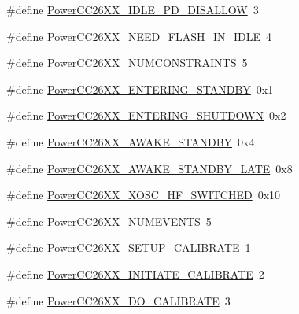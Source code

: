 \begin{DoxyCompactItemize}
\#define \hyperlink{_power_c_c26_x_x_8h_a1cdfc7000203fc9fb74ad3872c1136cc}{Power\+C\+C26\+X\+X\+\_\+\+I\+D\+L\+E\+\_\+\+P\+D\+\_\+\+D\+I\+S\+A\+L\+L\+O\+W}~3
\item 
\#define \hyperlink{_power_c_c26_x_x_8h_a1f1dee2876bca97a20c152ca9b6c2fb5}{Power\+C\+C26\+X\+X\+\_\+\+N\+E\+E\+D\+\_\+\+F\+L\+A\+S\+H\+\_\+\+I\+N\+\_\+\+I\+D\+L\+E}~4
\item 
\#define \hyperlink{_power_c_c26_x_x_8h_a08e787d2a1ff1b373b209e68fc797e31}{Power\+C\+C26\+X\+X\+\_\+\+N\+U\+M\+C\+O\+N\+S\+T\+R\+A\+I\+N\+T\+S}~5
\item 
\#define \hyperlink{_power_c_c26_x_x_8h_a88d658da388e2fc58328283b3349003e}{Power\+C\+C26\+X\+X\+\_\+\+E\+N\+T\+E\+R\+I\+N\+G\+\_\+\+S\+T\+A\+N\+D\+B\+Y}~0x1
\item 
\#define \hyperlink{_power_c_c26_x_x_8h_a09692bd5d3fb7c16fcf320b0490f29fa}{Power\+C\+C26\+X\+X\+\_\+\+E\+N\+T\+E\+R\+I\+N\+G\+\_\+\+S\+H\+U\+T\+D\+O\+W\+N}~0x2
\item 
\#define \hyperlink{_power_c_c26_x_x_8h_a7f9f2c7a5f0c307aeab0b9854d2384b9}{Power\+C\+C26\+X\+X\+\_\+\+A\+W\+A\+K\+E\+\_\+\+S\+T\+A\+N\+D\+B\+Y}~0x4
\item 
\#define \hyperlink{_power_c_c26_x_x_8h_ae9a4db5e58593a5bc2f6cbba3c8ed283}{Power\+C\+C26\+X\+X\+\_\+\+A\+W\+A\+K\+E\+\_\+\+S\+T\+A\+N\+D\+B\+Y\+\_\+\+L\+A\+T\+E}~0x8
\item 
\#define \hyperlink{_power_c_c26_x_x_8h_a592028a2a5ba6e323205a6400ef11b07}{Power\+C\+C26\+X\+X\+\_\+\+X\+O\+S\+C\+\_\+\+H\+F\+\_\+\+S\+W\+I\+T\+C\+H\+E\+D}~0x10
\item 
\#define \hyperlink{_power_c_c26_x_x_8h_ac622d8239ba9b69a379a5293b5d2d71d}{Power\+C\+C26\+X\+X\+\_\+\+N\+U\+M\+E\+V\+E\+N\+T\+S}~5
\item 
\#define \hyperlink{_power_c_c26_x_x_8h_a070dddd88803138074c5c3d4e0dc4473}{Power\+C\+C26\+X\+X\+\_\+\+S\+E\+T\+U\+P\+\_\+\+C\+A\+L\+I\+B\+R\+A\+T\+E}~1
\item 
\#define \hyperlink{_power_c_c26_x_x_8h_a7082f34adce9acdfcbbce1668c0afcf2}{Power\+C\+C26\+X\+X\+\_\+\+I\+N\+I\+T\+I\+A\+T\+E\+\_\+\+C\+A\+L\+I\+B\+R\+A\+T\+E}~2
\item 
\#define \hyperlink{_power_c_c26_x_x_8h_a136cfc27cb9c6a5f75c5975e725a990f}{Power\+C\+C26\+X\+X\+\_\+\+D\+O\+\_\+\+C\+A\+L\+I\+B\+R\+A\+T\+E}~3
\end{DoxyCompactItemize}
